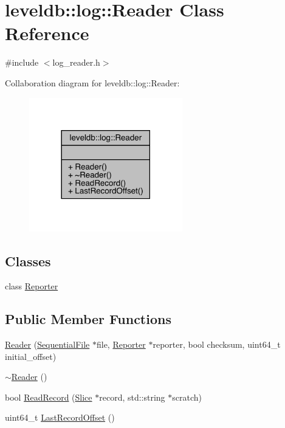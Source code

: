 \hypertarget{classleveldb_1_1log_1_1_reader}{}\section{leveldb\+::log\+::Reader Class Reference}
\label{classleveldb_1_1log_1_1_reader}


{\ttfamily \#include $<$log\+\_\+reader.\+h$>$}



Collaboration diagram for leveldb\+::log\+::Reader\+:
\nopagebreak
\begin{figure}[H]
\begin{center}
\leavevmode
\includegraphics[width=189pt]{classleveldb_1_1log_1_1_reader__coll__graph}
\end{center}
\end{figure}
\subsection*{Classes}
\begin{DoxyCompactItemize}
\item 
class \mbox{\hyperlink{classleveldb_1_1log_1_1_reader_1_1_reporter}{Reporter}}
\end{DoxyCompactItemize}
\subsection*{Public Member Functions}
\begin{DoxyCompactItemize}
\item 
\mbox{\hyperlink{classleveldb_1_1log_1_1_reader_a38c1a9988741af5429dad60cf79f0556}{Reader}} (\mbox{\hyperlink{classleveldb_1_1_sequential_file}{Sequential\+File}} $\ast$file, \mbox{\hyperlink{classleveldb_1_1log_1_1_reader_1_1_reporter}{Reporter}} $\ast$reporter, bool checksum, uint64\+\_\+t initial\+\_\+offset)
\item 
\mbox{\hyperlink{classleveldb_1_1log_1_1_reader_a52bc3896f8a0baee92f8c699553e7841}{$\sim$\+Reader}} ()
\item 
bool \mbox{\hyperlink{classleveldb_1_1log_1_1_reader_a84059598c9367cb677a9d70d77993282}{Read\+Record}} (\mbox{\hyperlink{classleveldb_1_1_slice}{Slice}} $\ast$record, std\+::string $\ast$scratch)
\item 
uint64\+\_\+t \mbox{\hyperlink{classleveldb_1_1log_1_1_reader_a358c5545069d86a61948ac0a021aa7f6}{Last\+Record\+Offset}} ()
\end{DoxyCompactItemize}


